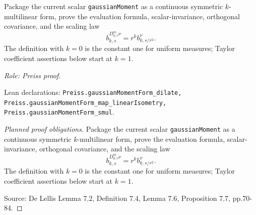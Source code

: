 \begin{lemma}
\label{lem:moment-covariance}








Package the current scalar \texttt{gaussianMoment} as a continuous symmetric
$k$-multilinear form, prove the evaluation formula, scalar-invariance,
orthogonal covariance, and the scaling law
\[
 b^{D^m_{0,r}\nu}_{k,s}=r^k b^\nu_{k,s/r^2}.
\]
The definition with $k=0$ is the constant one for uniform measures; Taylor
coefficient assertions below start at $k=1$.
\par\emph{Role: Preiss proof.}
\par Lean declarations: \texttt{Preiss.gaussianMomentForm\_dilate, Preiss.gaussianMomentForm\_map\_linearIsometry, Preiss.gaussianMomentForm\_smul}.
\end{lemma}
\begin{proof}[Planned proof obligations]

Package the current scalar \texttt{gaussianMoment} as a continuous symmetric
$k$-multilinear form, prove the evaluation formula, scalar-invariance,
orthogonal covariance, and the scaling law
\[
 b^{D^m_{0,r}\nu}_{k,s}=r^k b^\nu_{k,s/r^2}.
\]
The definition with $k=0$ is the constant one for uniform measures; Taylor
coefficient assertions below start at $k=1$.
\par Source: De Lellis Lemma 7.2, Definition 7.4, Lemma 7.6, Proposition 7.7, pp.70-84.
\end{proof}

